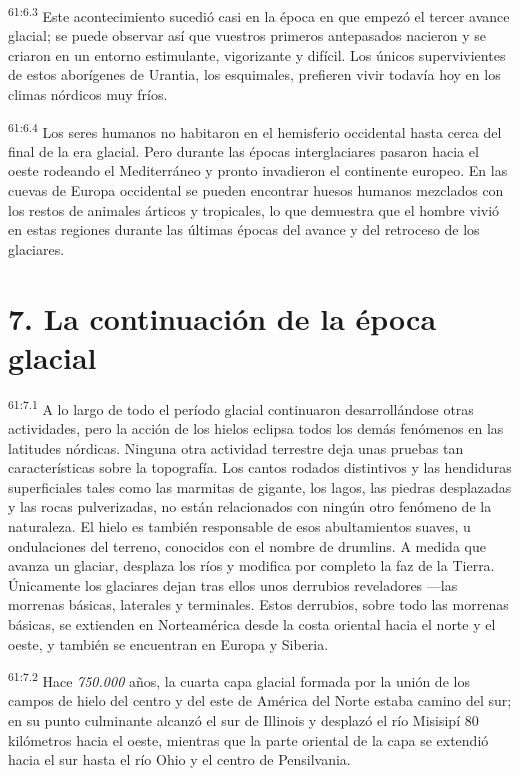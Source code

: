 \par
\textsuperscript{61:6.3} Este acontecimiento sucedió casi en la época en que empezó el tercer avance glacial; se puede observar así que vuestros primeros antepasados nacieron y se criaron en un entorno estimulante, vigorizante y difícil. Los únicos supervivientes de estos aborígenes de Urantia, los esquimales, prefieren vivir todavía hoy en los climas nórdicos muy fríos.

\par
\textsuperscript{61:6.4} Los seres humanos no habitaron en el hemisferio occidental hasta cerca del final de la era glacial. Pero durante las épocas interglaciares pasaron hacia el oeste rodeando el Mediterráneo y pronto invadieron el continente europeo. En las cuevas de Europa occidental se pueden encontrar huesos humanos mezclados con los restos de animales árticos y tropicales, lo que demuestra que el hombre vivió en estas regiones durante las últimas épocas del avance y del retroceso de los glaciares.

\section*{7. La continuación de la época glacial}
\par
\textsuperscript{61:7.1} A lo largo de todo el período glacial continuaron desarrollándose otras actividades, pero la acción de los hielos eclipsa todos los demás fenómenos en las latitudes nórdicas. Ninguna otra actividad terrestre deja unas pruebas tan características sobre la topografía. Los cantos rodados distintivos y las hendiduras superficiales tales como las marmitas de gigante, los lagos, las piedras desplazadas y las rocas pulverizadas, no están relacionados con ningún otro fenómeno de la naturaleza. El hielo es también responsable de esos abultamientos suaves, u ondulaciones del terreno, conocidos con el nombre de drumlins. A medida que avanza un glaciar, desplaza los ríos y modifica por completo la faz de la Tierra. Únicamente los glaciares dejan tras ellos unos derrubios reveladores ---las morrenas básicas, laterales y terminales. Estos derrubios, sobre todo las morrenas básicas, se extienden en Norteamérica desde la costa oriental hacia el norte y el oeste, y también se encuentran en Europa y Siberia.

\par
\textsuperscript{61:7.2} Hace \textit{750.000} años, la cuarta capa glacial formada por la unión de los campos de hielo del centro y del este de América del Norte estaba camino del sur; en su punto culminante alcanzó el sur de Illinois y desplazó el río Misisipí 80 kilómetros hacia el oeste, mientras que la parte oriental de la capa se extendió hacia el sur hasta el río Ohio y el centro de Pensilvania.

